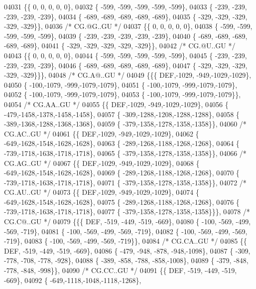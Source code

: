 \begin{DoxyCode}
04031 \{\{    0,    0,    0,    0,    0\},
04032 \{ -599, -599, -599, -599, -599\},
04033 \{ -239, -239, -239, -239, -239\},
04034 \{ -689, -689, -689, -689, -689\},
04035 \{ -329, -329, -329, -329, -329\}\},
04036 \textcolor{comment}{/* CG.@G..GU */}
04037 \{\{    0,    0,    0,    0,    0\},
04038 \{ -599, -599, -599, -599, -599\},
04039 \{ -239, -239, -239, -239, -239\},
04040 \{ -689, -689, -689, -689, -689\},
04041 \{ -329, -329, -329, -329, -329\}\},
04042 \textcolor{comment}{/* CG.@U..GU */}
04043 \{\{    0,    0,    0,    0,    0\},
04044 \{ -599, -599, -599, -599, -599\},
04045 \{ -239, -239, -239, -239, -239\},
04046 \{ -689, -689, -689, -689, -689\},
04047 \{ -329, -329, -329, -329, -329\}\}\},
04048 \textcolor{comment}{/* CG.A@..GU */}
04049 \{\{\{  DEF,-1029, -949,-1029,-1029\},
04050 \{ -100,-1079, -999,-1079,-1079\},
04051 \{ -100,-1079, -999,-1079,-1079\},
04052 \{ -100,-1079, -999,-1079,-1079\},
04053 \{ -100,-1079, -999,-1079,-1079\}\},
04054 \textcolor{comment}{/* CG.AA..GU */}
04055 \{\{  DEF,-1029, -949,-1029,-1029\},
04056 \{ -479,-1458,-1378,-1458,-1458\},
04057 \{ -309,-1288,-1208,-1288,-1288\},
04058 \{ -389,-1368,-1288,-1368,-1368\},
04059 \{ -379,-1358,-1278,-1358,-1358\}\},
04060 \textcolor{comment}{/* CG.AC..GU */}
04061 \{\{  DEF,-1029, -949,-1029,-1029\},
04062 \{ -649,-1628,-1548,-1628,-1628\},
04063 \{ -289,-1268,-1188,-1268,-1268\},
04064 \{ -739,-1718,-1638,-1718,-1718\},
04065 \{ -379,-1358,-1278,-1358,-1358\}\},
04066 \textcolor{comment}{/* CG.AG..GU */}
04067 \{\{  DEF,-1029, -949,-1029,-1029\},
04068 \{ -649,-1628,-1548,-1628,-1628\},
04069 \{ -289,-1268,-1188,-1268,-1268\},
04070 \{ -739,-1718,-1638,-1718,-1718\},
04071 \{ -379,-1358,-1278,-1358,-1358\}\},
04072 \textcolor{comment}{/* CG.AU..GU */}
04073 \{\{  DEF,-1029, -949,-1029,-1029\},
04074 \{ -649,-1628,-1548,-1628,-1628\},
04075 \{ -289,-1268,-1188,-1268,-1268\},
04076 \{ -739,-1718,-1638,-1718,-1718\},
04077 \{ -379,-1358,-1278,-1358,-1358\}\}\},
04078 \textcolor{comment}{/* CG.C@..GU */}
04079 \{\{\{  DEF, -519, -449, -519, -669\},
04080 \{ -100, -569, -499, -569, -719\},
04081 \{ -100, -569, -499, -569, -719\},
04082 \{ -100, -569, -499, -569, -719\},
04083 \{ -100, -569, -499, -569, -719\}\},
04084 \textcolor{comment}{/* CG.CA..GU */}
04085 \{\{  DEF, -519, -449, -519, -669\},
04086 \{ -479, -948, -878, -948,-1098\},
04087 \{ -309, -778, -708, -778, -928\},
04088 \{ -389, -858, -788, -858,-1008\},
04089 \{ -379, -848, -778, -848, -998\}\},
04090 \textcolor{comment}{/* CG.CC..GU */}
04091 \{\{  DEF, -519, -449, -519, -669\},
04092 \{ -649,-1118,-1048,-1118,-1268\},

\end{DoxyCode}
